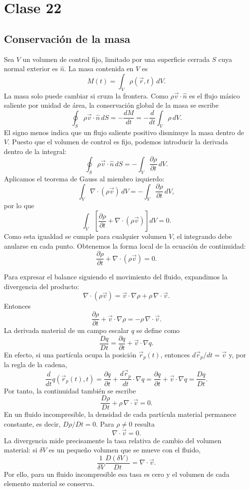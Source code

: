\chapter{Clase 22}

\section{Conservación de la masa}

Sea $V$ un volumen de control fijo, limitado por una superficie cerrada $S$ cuya normal exterior es $\hat n$. La masa contenida en $V$ es
\[
M(t)=\int_V\rho(\vec r,t)\,dV.
\]
La masa solo puede cambiar si cruza la frontera. Como $\rho\vec v\cdot\hat n$ es el flujo másico saliente por unidad de área, la conservación global de la masa se escribe
\[
\oint_S\rho\vec v\cdot\hat n\,dS
=-\frac{dM}{dt}
=-\frac{d}{dt}\int_V\rho\,dV.
\]
El signo menos indica que un flujo saliente positivo disminuye la masa dentro de $V$. Puesto que el volumen de control es fijo, podemos introducir la derivada dentro de la integral:
\[
\oint_S\rho\vec v\cdot\hat n\,dS
=-\int_V\frac{\partial\rho}{\partial t}\,dV.
\]
Aplicamos el teorema de Gauss al miembro izquierdo:
\[
\int_V\nabla\cdot(\rho\vec v)\,dV
=-\int_V\frac{\partial\rho}{\partial t}\,dV,
\]
por lo que
\[
\int_V\left[\frac{\partial\rho}{\partial t}
+\nabla\cdot(\rho\vec v)\right]dV=0.
\]
Como esta igualdad se cumple para cualquier volumen $V$, el integrando debe anularse en cada punto. Obtenemos la forma local de la ecuación de continuidad:
\[
\boxed{\frac{\partial\rho}{\partial t}
+\nabla\cdot(\rho\vec v)=0.}
\]

Para expresar el balance siguiendo el movimiento del fluido, expandimos la divergencia del producto:
\[
\nabla\cdot(\rho\vec v)
=\vec v\cdot\nabla\rho+\rho\,\nabla\cdot\vec v.
\]
Entonces
\[
\frac{\partial\rho}{\partial t}
+\vec v\cdot\nabla\rho
=-\rho\,\nabla\cdot\vec v.
\]
La derivada material de un campo escalar $q$ se define como
\[
\frac{Dq}{Dt}
=\frac{\partial q}{\partial t}+\vec v\cdot\nabla q.
\]
En efecto, si una partícula ocupa la posición $\vec r_p(t)$, entonces $d\vec r_p/dt=\vec v$ y, por la regla de la cadena,
\[
\frac{d}{dt}q(\vec r_p(t),t)
=\frac{\partial q}{\partial t}
+\frac{d\vec r_p}{dt}\cdot\nabla q
=\frac{\partial q}{\partial t}+\vec v\cdot\nabla q
=\frac{Dq}{Dt}.
\]
Por tanto, la continuidad también se escribe
\[
\boxed{\frac{D\rho}{Dt}+\rho\,\nabla\cdot\vec v=0.}
\]
En un fluido incompresible, la densidad de cada partícula material permanece constante, es decir, $D\rho/Dt=0$. Para $\rho\ne0$ resulta
\[
\boxed{\nabla\cdot\vec v=0.}
\]
La divergencia mide precisamente la tasa relativa de cambio del volumen material: si $\delta V$ es un pequeño volumen que se mueve con el fluido,
\[
\frac{1}{\delta V}\frac{D(\delta V)}{Dt}=\nabla\cdot\vec v.
\]
Por ello, para un fluido incompresible esa tasa es cero y el volumen de cada elemento material se conserva.

